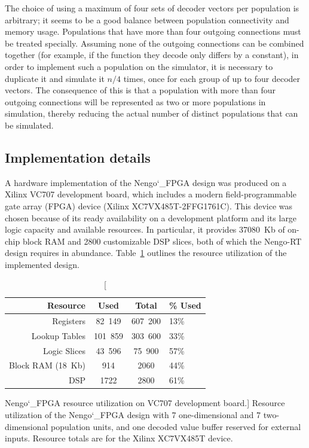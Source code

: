 \documentclass[english]{article}
\newcommand{\design}{Nengo\char`_FPGA}  %
\begin{document}
The choice of using a maximum of four sets of decoder vectors per population is arbitrary; it seems to be a good balance between
population connectivity and memory usage. Populations that have more than four outgoing connections must be treated specially.
Assuming none of the outgoing connections can be combined together (for example, if the function they decode only differs by a constant),
in order to implement such a population on the simulator, it is necessary to duplicate it and simulate it
$n/4$ times, once for each group of up to four decoder vectors.
The consequence of this is that a population with more than
four outgoing connections will be represented as two or more populations in simulation, thereby reducing the actual number of
distinct populations that can be simulated.

\subsection{Implementation details}

A hardware implementation of the \design{} design was produced on a Xilinx VC707 development board, which includes a modern field-programmable gate array (FPGA)
device (Xilinx XC7VX485T-2FFG1761C). This device was chosen because of its ready availability on a development platform and its large logic capacity and available resources.
In particular, it provides 37080~Kb of on-chip block RAM and 2800 customizable DSP slices, both of which the Nengo-RT design requires in abundance.
Table~\ref{tbl:utilization} outlines the resource utilization of the implemented design.

\begin{table}
\begin{tabular}{|r|c|c|l|}
\hline
Resource & Used & Total & \% Used \\
\hline
\hline
Registers & 82~149 & 607~200 & 13\% \\
Lookup Tables & 101~859 & 303~600 & 33\% \\
Logic Slices & 43~596 & 75~900 & 57\% \\
Block RAM (18~Kb) & 914 & 2060 & 44\% \\
DSP & 1722 & 2800 & 61\% \\
\hline
\end{tabular}
\caption[\design{} resource utilization on VC707 development board.]
{Resource utilization of the \design{} design with 7 one-dimensional and 7 two-dimensional population units, and one decoded value buffer reserved for external inputs.
Resource totals are for the Xilinx XC7VX485T device.}
\label{tbl:utilization}
\end{table}
\end{document}
